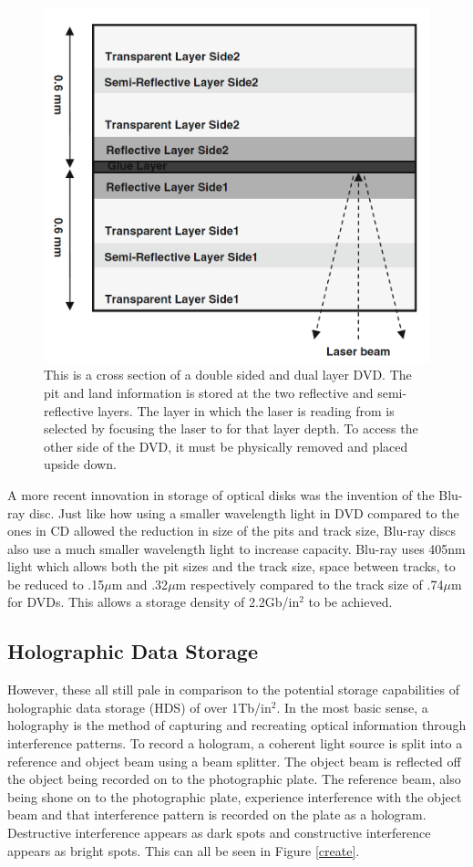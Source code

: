 \documentclass[ notitlepage, numerical, 11pt]{revtex4-1} %
\begin{document}
\begin{figure}[H]
\centerline{\includegraphics[scale=.45]{DVD.png}}
\caption{This is a cross section of a double sided and dual layer DVD. The pit and land information is stored at the two reflective and semi-reflective layers. The layer in which the laser is reading from is selected by focusing the laser to for that layer depth. To access the other side of the DVD, it must be physically removed and placed upside down.}
\label{DVD}
\end{figure} 

A more recent innovation in storage of optical disks was the invention of the Blu-ray disc. Just like how using a smaller wavelength light in DVD compared to the ones in CD allowed the reduction in size of the pits and track size, Blu-ray discs also use a much smaller wavelength light to increase capacity. Blu-ray uses 405nm light which allows both the pit sizes and the track size, space between tracks, to be reduced to .15$\mu$m and .32$\mu$m respectively compared to the track size of .74$\mu$m for DVDs. This allows a storage density of 2.2Gb/in$^2$ to be achieved. 



\subsection{Holographic Data Storage}
However, these all still pale in comparison to the potential storage capabilities of holographic data storage (HDS) of over 1Tb/in$^2$. In the most basic sense, a holography is the method of capturing and recreating optical information through interference patterns. To record a hologram, a coherent light source is split into a reference and object beam using a beam splitter. The object beam is reflected off the object being recorded on to the photographic plate. The reference beam, also being shone on to the photographic plate, experience interference with the object beam and that interference pattern is recorded on the plate as a hologram. Destructive interference appears as dark spots and constructive interference appears as bright spots. This can all be seen in Figure \ref{create}. 
\end{document}
